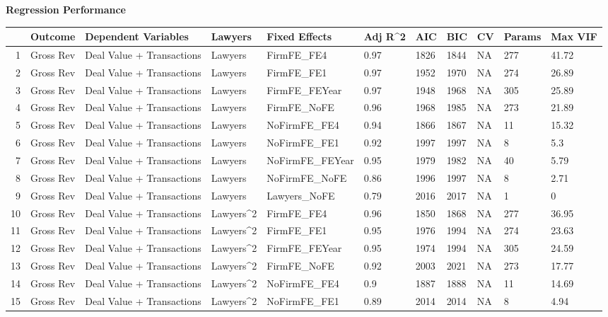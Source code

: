 \documentclass{article}
\begin{document}
\newpage
{\large \textbf{Regression Performance} }%
\begin{table}[H]
\centering
\begin{tabular}{rllllllllll}
  \hline
 & Outcome & Dependent Variables & Lawyers & Fixed Effects & Adj R^2 & AIC & BIC & CV & Params & Max VIF \\ 
  \hline
1 & Gross Rev & Deal Value + Transactions & Lawyers & FirmFE\_FE4 & 0.97 & 1826 & 1844 & NA & 277 & 41.72 \\ 
  2 & Gross Rev & Deal Value + Transactions & Lawyers & FirmFE\_FE1 & 0.97 & 1952 & 1970 & NA & 274 & 26.89 \\ 
  3 & Gross Rev & Deal Value + Transactions & Lawyers & FirmFE\_FEYear & 0.97 & 1948 & 1968 & NA & 305 & 25.89 \\ 
  4 & Gross Rev & Deal Value + Transactions & Lawyers & FirmFE\_NoFE & 0.96 & 1968 & 1985 & NA & 273 & 21.89 \\ 
  5 & Gross Rev & Deal Value + Transactions & Lawyers & NoFirmFE\_FE4 & 0.94 & 1866 & 1867 & NA & 11 & 15.32 \\ 
  6 & Gross Rev & Deal Value + Transactions & Lawyers & NoFirmFE\_FE1 & 0.92 & 1997 & 1997 & NA & 8 & 5.3 \\ 
  7 & Gross Rev & Deal Value + Transactions & Lawyers & NoFirmFE\_FEYear & 0.95 & 1979 & 1982 & NA & 40 & 5.79 \\ 
  8 & Gross Rev & Deal Value + Transactions & Lawyers & NoFirmFE\_NoFE & 0.86 & 1996 & 1997 & NA & 8 & 2.71 \\ 
  9 & Gross Rev & Deal Value + Transactions & Lawyers & Lawyers\_NoFE & 0.79 & 2016 & 2017 & NA & 1 & 0 \\ 
  10 & Gross Rev & Deal Value + Transactions & Lawyers^2 & FirmFE\_FE4 & 0.96 & 1850 & 1868 & NA & 277 & 36.95 \\ 
  11 & Gross Rev & Deal Value + Transactions & Lawyers^2 & FirmFE\_FE1 & 0.95 & 1976 & 1994 & NA & 274 & 23.63 \\ 
  12 & Gross Rev & Deal Value + Transactions & Lawyers^2 & FirmFE\_FEYear & 0.95 & 1974 & 1994 & NA & 305 & 24.59 \\ 
  13 & Gross Rev & Deal Value + Transactions & Lawyers^2 & FirmFE\_NoFE & 0.92 & 2003 & 2021 & NA & 273 & 17.77 \\ 
  14 & Gross Rev & Deal Value + Transactions & Lawyers^2 & NoFirmFE\_FE4 & 0.9 & 1887 & 1888 & NA & 11 & 14.69 \\ 
  15 & Gross Rev & Deal Value + Transactions & Lawyers^2 & NoFirmFE\_FE1 & 0.89 & 2014 & 2014 & NA & 8 & 4.94 \\ 

\end{tabular}
\end{table}
\end{document}

